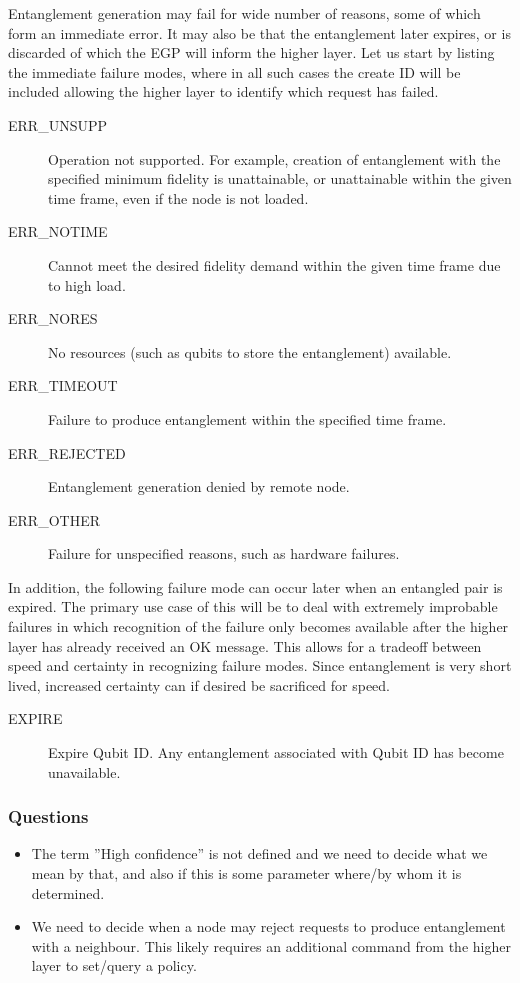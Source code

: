 \documentclass{article}
\begin{document}
Entanglement generation may fail for wide number of reasons, some of which form an immediate error. It may also be that the entanglement later expires, or is discarded
of which the EGP will inform the higher layer. Let us start by listing the immediate failure modes, where in all such cases the create ID will be included allowing the
higher layer to identify which request has failed.\\
\begin{description}
\item[ERR\_UNSUPP] Operation not supported. For example, creation of entanglement with the specified minimum fidelity is unattainable, or 
unattainable within the given time frame, even if the node is not loaded. 
\item[ERR\_NOTIME] Cannot meet the desired fidelity demand within the given time frame due to high load.
\item[ERR\_NORES] No resources (such as qubits to store the entanglement) available.
\item[ERR\_TIMEOUT] Failure to produce entanglement within the specified time frame.
\item[ERR\_REJECTED] Entanglement generation denied by remote node.
\item[ERR\_OTHER] Failure for unspecified reasons, such as hardware failures.
\end{description}
In addition, the following failure mode can occur later when an entangled pair is expired. The primary use case of this will be to deal with extremely improbable failures
in which recognition of the failure only becomes available after the higher layer has already received an OK message. This allows for 
a tradeoff between speed and certainty in recognizing failure modes. Since entanglement is very short lived, increased certainty can if desired be sacrificed for speed.
\begin{description}
\item[EXPIRE] Expire Qubit ID. Any entanglement associated with Qubit ID has become unavailable.
\end{description}

\subsubsection{Questions}
\begin{itemize}
\item The term ''High confidence'' is not defined and we need to decide what we mean by that, and also if this is some parameter where/by whom it is determined.
\item We need to decide when a node may reject requests to produce entanglement with a neighbour. This likely requires an additional command from the higher layer to set/query a policy.
\end{itemize}
\end{document}
